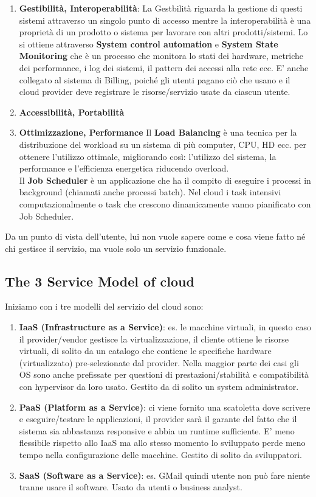 \documentclass[11pt, twocolumn]{article}
\begin{document}
\begin{enumerate}[noitemsep, topsep=0ex, leftmargin=*]
	\item \textbf{Gestibilità, Interoperabilità}:
	La Gestbilità riguarda la gestione di questi sistemi attraverso un singolo punto di accesso mentre la interoperabilità è una proprietà di un prodotto o sistema per lavorare con altri prodotti/sistemi.
	Lo si ottiene attraverso \textbf{System control automation} e \textbf{System State Monitoring} che è un processo che monitora lo stati dei hardware, metriche dei performance, i log dei sistemi, il pattern dei accessi alla rete ecc.
	E' anche collegato al sistema di Billing, poiché gli utenti pagano ciò che usano e il cloud provider deve registrare le risorse/servizio usate da ciascun utente.\\
	\item \textbf{Accessibilità, Portabilità}
	
	\item \textbf{Ottimizzazione, Performance}
	Il \textbf{Load Balancing} è una tecnica per la distribuzione del workload su un sistema di più computer, CPU, HD ecc. per ottenere l'utilizzo ottimale, migliorando così: l'utilizzo del sistema, la performance e l'efficienza energetica riducendo overload.\\
	Il \textbf{Job Scheduler} è un applicazione che ha il compito di eseguire i processi in background (chiamati anche processi batch).
	Nel cloud i task intensivi computazionalmente o task che crescono dinamicamente vanno pianificato con Job Scheduler.
\end{enumerate}
Da un punto di vista dell'utente, lui non vuole sapere come e cosa viene fatto né chi gestisce il servizio, ma vuole solo un servizio funzionale.

\subsection{The 3 Service Model of cloud}
Iniziamo con i tre modelli del servizio del cloud sono:
\begin{enumerate}[wide, topsep=0ex, noitemsep]
	\item \textbf{IaaS (Infrastructure as a Service)}: es. le macchine virtuali, in questo caso il provider/vendor gestisce la virtualizzazione, il cliente ottiene le risorse virtuali, di solito da un catalogo che contiene le specifiche hardware (virtualizzato) pre-selezionate dal provider. Nella maggior parte dei casi gli OS sono anche prefissate per questioni di prestazioni/stabilità e compatibilità con hypervisor da loro usato. Gestito da di solito un system administrator.
	\item \textbf{PaaS (Platform as a Service)}: ci viene fornito una scatoletta dove scrivere e eseguire/testare le applicazioni, il provider sarà il garante del fatto che il sistema sia abbastanza responsive e abbia un runtime sufficiente. E' meno flessibile rispetto allo IaaS ma allo stesso momento lo sviluppato perde meno tempo nella configurazione delle macchine. Gestito di solito da sviluppatori.
	\item \textbf{SaaS (Software as a Service)}: es. GMail quindi utente non può fare niente tranne usare il software. Usato da utenti o business analyst.
\end{enumerate}
\end{document}

